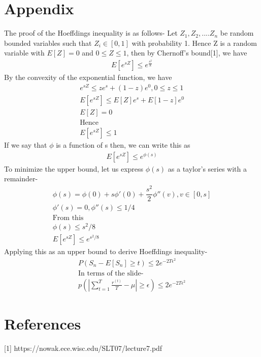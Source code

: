 \documentclass[11pt]{article}
\begin{document}
\newpage
{


}

\section{Appendix}
The proof of the Hoeffdings inequality is as follows-
Let $Z_1, Z_2, .... Z_n$ be random bounded variables such that $Z_i \in [0,1]$ with probability 1. Hence Z is a random variable with $E[Z]=0$ and $0 \le Z \le 1$, then by Chernoff's bound[1], we have 
\begin{align*}
    E[e^{sZ}]\le e^{\frac{s^2}{8}}
\end{align*}
By the convexity of the exponential function, we have 
\begin{align*}
    e^{sZ} \le ze^s + (1-z)e^0, 0 \le z \le 1 \\
    E[e^{sZ}] \le E[Z]e^{s} + E[1-z]e^0 \\
    E[Z]=0 \\
    \text{Hence} \\
    E[e^{sZ}] \le 1
\end{align*}
If we say that $\phi$ is a function of s then, we can write this as
\begin{align*}
    E[e^{sZ}] \le e^{\phi(s)}
\end{align*}
To minimize the upper bound, let us express $\phi(s)$ as a taylor's series with a remainder-
\begin{align*}
    \phi(s) = \phi(0) + s \phi'(0) + \dfrac{s^2}{2}\phi''(v), v \in [0,s] \\
    \phi'(s)=0,  \phi''(s)\le 1/4\\
    \text{From this} \\
    \phi(s) \le s^2 /8 \\
    E[e^{sZ}] \le e^{s^2 /8}
\end{align*}
Applying this as an upper bound to derive Hoeffdings inequality- 
\begin{align*}
    P(S_n - E[S_n] \ge t) \le 2e^{-2T\epsilon^2} \\ 
    \text{In terms of the slide-} \\
    p \left( \left| \sum_{t=1}^T \frac{r^{(t)}}{T} - \mu \right| \geq \epsilon \right) \leq 2 e^{-2T\epsilon^2}
\end{align*}
\newpage
\section{References}
[1] https://nowak.ece.wisc.edu/SLT07/lecture7.pdf

\end{document}
